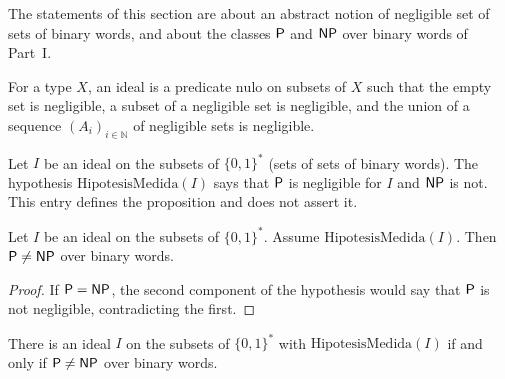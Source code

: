 The statements of this section are about an abstract notion of negligible set of sets of binary words, and
about the classes $\mathsf{P}$ and $\mathsf{NP}$ over binary words of Part~I.

\begin{definition}
  \label{def:scales-ideal}
  \leanok
  For a type $X$, an ideal is a predicate $\mathrm{nulo}$ on subsets of $X$ such that the empty set is
  negligible, a subset of a negligible set is negligible, and the union of a sequence
  $(A_i)_{i\in\mathbb{N}}$ of negligible sets is negligible.
  \own{}
\end{definition}

\begin{definition}
  \label{def:scales-hipotesis-medida}
  \leanok
  Let $I$ be an ideal on the subsets of $\{0,1\}^{*}$ (sets of sets of binary words). The hypothesis
  $\mathrm{HipotesisMedida}(I)$ says that $\mathsf{P}$ is negligible for $I$ and $\mathsf{NP}$ is not. This entry
  defines the proposition and does not assert it.
  \own{}
\end{definition}

\begin{theorem}
  \label{thm:scales-medida-implica}
  \leanok
  Let $I$ be an ideal on the subsets of $\{0,1\}^{*}$. Assume $\mathrm{HipotesisMedida}(I)$. Then $\mathsf{P} \ne
  \mathsf{NP}$ over binary words.
  \own{}
\end{theorem}

\begin{proof}
  \leanok
  If $\mathsf{P} = \mathsf{NP}$, the second component of the hypothesis would say that $\mathsf{P}$ is not negligible,
  contradicting the first.
\end{proof}

\begin{theorem}
  \label{thm:scales-elegir-despues}
  \leanok
  There is an ideal $I$ on the subsets of $\{0,1\}^{*}$ with $\mathrm{HipotesisMedida}(I)$ if and only if
  $\mathsf{P} \ne \mathsf{NP}$ over binary words.
  \own{}
\end{theorem}

